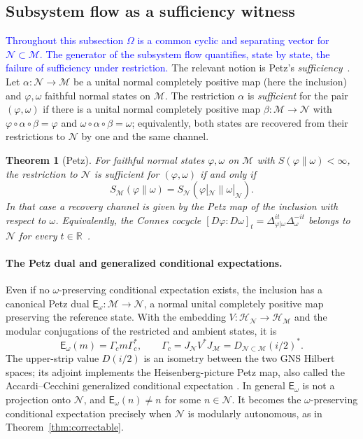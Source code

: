 \documentclass[a4paper,11pt]{article}
\newtheorem{theorem}{Theorem}
\theoremstyle{definition}
\newcommand{\mN}{\mathcal{N}}
\newcommand{\mH}{\mathcal{H}}
\newcommand{\mM}{\mathcal{M}}
\newcommand{\NL}[1]{\textcolor{blue}{#1}}
\begin{document}
\subsection{Subsystem flow as a sufficiency witness}\label{subsec:QEC-sufficiency}

\NL{Throughout this subsection $\Omega$ is a common cyclic and separating vector for $\mN\subset\mM$. The generator of the subsystem flow quantifies, state by state, the failure of sufficiency under restriction.} The relevant notion is Petz's \emph{sufficiency}~\cite{Petz1986,Petz1988,OhyaPetz1993}. Let $\alpha:\mN\to\mM$ be a unital normal completely positive map (here the inclusion) and $\varphi,\omega$ faithful normal states on $\mM$. The restriction $\alpha$ is \emph{sufficient} for the pair $(\varphi,\omega)$ if there is a unital normal completely positive map $\beta:\mM\to\mN$ with $\varphi\circ\alpha\circ\beta=\varphi$ and $\omega\circ\alpha\circ\beta=\omega$; equivalently, both states are recovered from their restrictions to $\mN$ by one and the same channel.

\begin{theorem}[Petz]\label{thm:Petz}
For faithful normal states $\varphi,\omega$ on $\mM$ with $S(\varphi\|\omega)<\infty$, the restriction to $\mN$ is sufficient for $(\varphi,\omega)$ if and only if
\[
 S_{\mM}(\varphi\|\omega)=S_{\mN}(\varphi|_{\mN}\|\omega|_{\mN}) .
\]
In that case a recovery channel is given by the Petz map of the inclusion with respect to $\omega$. Equivalently, the Connes cocycle $[D\varphi:D\omega]_t=\Delta_{\varphi|\omega}^{it}\Delta_{\omega}^{-it}$ belongs to $\mN$ for every $t\in\mathbb R$~\cite{Petz1988,JencovaPetz2006}.
\end{theorem}

\paragraph{The Petz dual and generalized conditional expectations.}
Even if no $\omega$-preserving conditional expectation exists, the inclusion
has a canonical Petz dual $\mathsf E_\omega:\mM\to\mN$, a normal unital
completely positive map preserving the reference state. With the
embedding $V:\mH_{\mN}\to\mH_{\mM}$ and the modular conjugations of the
restricted and ambient states, it is
\begin{equation}
 \boxed{\quad
 \mathsf E_\omega(m)=\Gamma_c m\Gamma_c^*,\qquad
 \Gamma_c=J_{\mN}V^*J_{\mM}
 =D_{\mN\subset\mM}(i/2)^*.\quad}
 \label{eq:QEC-Petz-dual}
\end{equation}
The upper-strip value $D(i/2)$ is an isometry between the two GNS
Hilbert spaces; its adjoint implements the Heisenberg-picture Petz map,
also called the Accardi--Cecchini generalized conditional expectation
\cite{AccardiCecchini1982,Petz1988}. In general $\mathsf E_\omega$ is
not a projection onto $\mN$, and $\mathsf E_\omega(n)\ne n$ for some
$n\in\mN$. It becomes the $\omega$-preserving conditional expectation
precisely when $\mN$ is modularly autonomous, as in
Theorem~\ref{thm:correctable}.
\end{document}
